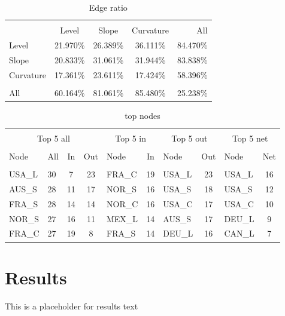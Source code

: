 \documentclass{article}
\begin{document}

\begin{table}[h]
\caption{Edge ratio} %
\fontsize{10}{10}\selectfont
\centering%
\begin{tabular}{l | ccc  r}%
\hline\hline \\ [-1.5ex]                         %


	&	Level	&	Slope	&	Curvature	&	All	\\
Level	&	21.970\%	&	26.389\%	&	36.111\%	&	84.470\%	\\
Slope	&	20.833\%	&	31.061\%	&	31.944\%	&	83.838\%	\\
Curvature	&	17.361\%	&	23.611\%	&	17.424\%	&	58.396\%	\\
\hline \\ [-1.5ex]  
All	&	60.164\%	&	81.061\%	&	85.480\%	&	25.238\%	\\


\hline            
\end{tabular}
\label{table:nonlin}%
\end{table}


\begin{table}[h]
\caption{top nodes} %
\fontsize{10}{10}\selectfont
\setlength{\tabcolsep}{12pt}
\centering%
\begin{tabular}{l  lcc  lc lc  lc}%

\hline\hline \\ [-1.5ex]                         %


\multicolumn{4}{c}{Top 5 all}					&	\multicolumn{2}{c}{Top 5 in}			&	\multicolumn{2}{c}{Top 5 out}			&	\multicolumn{2}{c}{Top 5 net}	\\	
\hline \\ [-1.5ex]    
Node	&	All	&	In	&	Out	&	Node	&	In	&	Node	&	Out	&	Node	&	Net	\\
\hline \\ [-1.5ex]    
USA\_L&	30	&	7	&	23	&	FRA\_C	&	19	&	USA\_L	&	23	&	USA\_L	&	16	\\
AUS\_S	&	28	&	11	&	17	&	NOR\_S	&	16	&	USA\_S	&	18	&	USA\_S	&	12	\\
FRA\_S	&	28	&	14	&	14	&	NOR\_C	&	16	&	USA\_C	&	17	&	USA\_C	&	10	\\
NOR\_S	&	27	&	16	&	11	&	MEX\_L	&	14	&	AUS\_S	&	17	&	DEU\_L	&	9	\\
FRA\_C	&	27	&	19	&	8	&	FRA\_S	&	14	&	DEU\_L	&	16	&	CAN\_L	&	7	\\




\hline            
\end{tabular}
\label{table:nonlin}%
\end{table}


\section{Results}

This is a placeholder for results text





\end{document}
